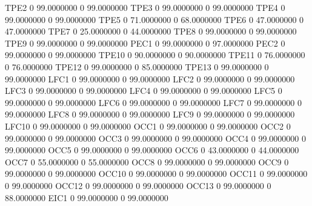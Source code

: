 \documentclass[
  11pt,
  a4paper,
  DIV=12,captions=tableheading,oneside,titlepage]{scrbook}
\let\oldverbatim\verbatim
\let\endoldverbatim\endverbatim
\renewenvironment{verbatim}{\footnotesize\oldverbatim}{\endoldverbatim}
\begin{document}
\begin{verbatim}
  TPE2                   0    99.0000000             0    99.0000000 
  TPE3                   0    99.0000000             0    99.0000000 
  TPE4                   0    99.0000000             0    99.0000000 
  TPE5                   0    71.0000000             0    68.0000000 
  TPE6                   0    47.0000000             0    47.0000000 
  TPE7                   0    25.0000000             0    44.0000000 
  TPE8                   0    99.0000000             0    99.0000000 
  TPE9                   0    99.0000000             0    99.0000000 
  PEC1                   0    99.0000000             0    97.0000000 
  PEC2                   0    99.0000000             0    99.0000000 
  TPE10                  0    90.0000000             0    90.0000000 
  TPE11                  0    76.0000000             0    76.0000000 
  TPE12                  0    99.0000000             0    85.0000000 
  TPE13                  0    99.0000000             0    99.0000000 
  LFC1                   0    99.0000000             0    99.0000000 
  LFC2                   0    99.0000000             0    99.0000000 
  LFC3                   0    99.0000000             0    99.0000000 
  LFC4                   0    99.0000000             0    99.0000000 
  LFC5                   0    99.0000000             0    99.0000000 
  LFC6                   0    99.0000000             0    99.0000000 
  LFC7                   0    99.0000000             0    99.0000000 
  LFC8                   0    99.0000000             0    99.0000000 
  LFC9                   0    99.0000000             0    99.0000000 
  LFC10                  0    99.0000000             0    99.0000000 
  OCC1                   0    99.0000000             0    99.0000000 
  OCC2                   0    99.0000000             0    99.0000000 
  OCC3                   0    99.0000000             0    99.0000000 
  OCC4                   0    99.0000000             0    99.0000000 
  OCC5                   0    99.0000000             0    99.0000000 
  OCC6                   0    43.0000000             0    44.0000000 
  OCC7                   0    55.0000000             0    55.0000000 
  OCC8                   0    99.0000000             0    99.0000000 
  OCC9                   0    99.0000000             0    99.0000000 
  OCC10                  0    99.0000000             0    99.0000000 
  OCC11                  0    99.0000000             0    99.0000000 
  OCC12                  0    99.0000000             0    99.0000000 
  OCC13                  0    99.0000000             0    88.0000000 
  EIC1                   0    99.0000000             0    99.0000000 

\end{verbatim}
\end{document}
